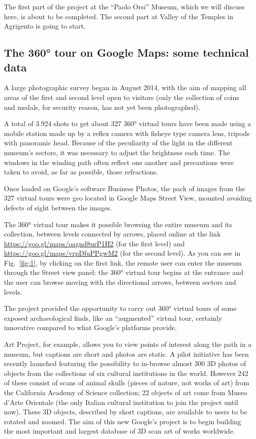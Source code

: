 \documentclass[amsthm,ebook]{saparticle}
\begin{document}
The first part of the project at the ``Paolo Orsi'' Museum, which we will discuss here, is about to be completed. The
second part at Valley of the Temples in Agrigento is going to start.




\subsection{The 360° tour on Google Maps: some technical data}


A large photographic survey began in August 2014, with the aim of mapping all areas of the first and second level open
to visitors (only the collection of coins and medals, for security reason, has not yet been photographed). 

A total of 3.924 shots to get about 327 360° virtual tours have been made using a mobile station made up by a reflex
camera with fisheye type camera lens, tripods with panoramic head. Because of the peculiarity of the light in the
different museum’s sectors, it was necessary to adjust the brightness each time. The windows in the winding path often
reflect one another and precautions were taken to avoid, as far as possible, those refractions.

Once loaded on Google’s software Business Photos, the pack of images from the 327 virtual tours were geo located in
Google Maps Street View, mounted avoiding defects of sight between the images. 

The 360° virtual tour makes it possible browsing the entire museum and its collection, between levels connected by
arrows, placed online at the link \url{https://goo.gl/maps/oagnd8urP1H2} (for the first level) and
\url{https://goo.gl/maps/vrpDfuPPgwM2} (for the second level). As you can see in Fig.~\ref{fig:1}, by clicking on the first link,
the remote user can enter the museum through the Street view panel: the 360° virtual tour begins at the entrance and
the user can browse moving with the directional arrows, between sectors and levels.

The project provided the opportunity to carry out 360° virtual tours of some exposed archaeological finds, like an
``augmented'' virtual tour, certainly innovative compared to what Google’s platforms provide. 

Art Project, for example, allows you to view points of interest along the path in a museum, but captions are short and
photos are static. A pilot initiative has been recently launched featuring the possibility to in-browse almost 300 3D
photos of objects from the collections of six cultural institutions in the world. However 242 of these consist of scans
of animal skulls (pieces of nature, not works of art) from the California Academy of Science collection; 22 objects of
art come from Museo d’Arte Orientale (the only Italian cultural institution to join the project until now). These 3D
objects, described by short captions, are available to users to be rotated and zoomed. The aim of this new Google’s
project is to begin building the most important and largest database of 3D scan art of works worldwide. 
\end{document}
